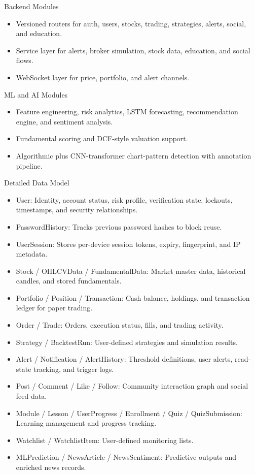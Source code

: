 \documentclass{beamer}
\begin{document}
\begin{frame}{Backend Modules}
\begin{itemize}
\item Versioned routers for auth, users, stocks, trading, strategies, alerts, social, and education.
\item Service layer for alerts, broker simulation, stock data, education, and social flows.
\item WebSocket layer for price, portfolio, and alert channels.
\end{itemize}
\end{frame}
\begin{frame}{ML and AI Modules}
\begin{itemize}
\item Feature engineering, risk analytics, LSTM forecasting, recommendation engine, and sentiment analysis.
\item Fundamental scoring and DCF-style valuation support.
\item Algorithmic plus CNN-transformer chart-pattern detection with annotation pipeline.
\end{itemize}
\end{frame}
\begin{frame}{Detailed Data Model}
\begin{itemize}
\item User: Identity, account status, risk profile, verification state, lockouts, timestamps, and security relationships.
\item PasswordHistory: Tracks previous password hashes to block reuse.
\item UserSession: Stores per-device session tokens, expiry, fingerprint, and IP metadata.
\item Stock / OHLCVData / FundamentalData: Market master data, historical candles, and stored fundamentals.
\item Portfolio / Position / Transaction: Cash balance, holdings, and transaction ledger for paper trading.
\item Order / Trade: Orders, execution status, fills, and trading activity.
\item Strategy / BacktestRun: User-defined strategies and simulation results.
\item Alert / Notification / AlertHistory: Threshold definitions, user alerts, read-state tracking, and trigger logs.
\item Post / Comment / Like / Follow: Community interaction graph and social feed data.
\item Module / Lesson / UserProgress / Enrollment / Quiz / QuizSubmission: Learning management and progress tracking.
\item Watchlist / WatchlistItem: User-defined monitoring lists.
\item MLPrediction / NewsArticle / NewsSentiment: Predictive outputs and enriched news records.
\end{itemize}
\end{frame}
\end{document}

